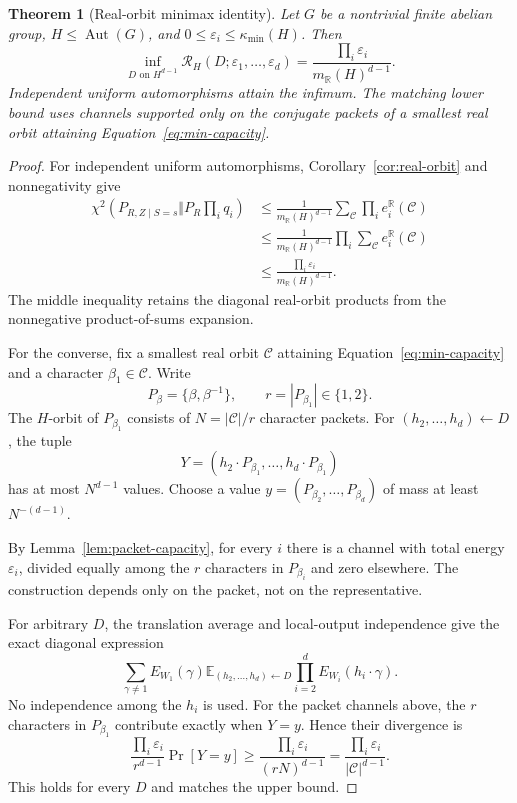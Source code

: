 \documentclass[11pt]{article}
\newtheorem{theorem}{Theorem}
\theoremstyle{definition}
\newcommand{\E}{\mathbb{E}}
\newcommand{\chitwo}{\chi^2}
\newcommand{\Aut}{\operatorname{Aut}}
\begin{document}
\begin{theorem}[Real-orbit minimax identity]\label{thm:minimax}
Let $G$ be a nontrivial finite abelian group, $H\leq\Aut(G)$, and
$0\leq\varepsilon_i\leq\kappa_{\min}(H)$.  Then
\begin{equation}\label{eq:minimax}
 \inf_{D\text{ on }H^{d-1}}
 \mathcal R_H(D;\varepsilon_1,\ldots,\varepsilon_d)
 =\frac{\prod_i\varepsilon_i}{m_{\mathbb R}(H)^{d-1}}.
\end{equation}
Independent uniform automorphisms attain the infimum.  The matching lower bound
uses channels supported only on the conjugate packets of a smallest real orbit
attaining Equation~\eqref{eq:min-capacity}.
\end{theorem}

\begin{proof}
For independent uniform automorphisms, Corollary~\ref{cor:real-orbit} and
nonnegativity give
\begin{align*}
 \chitwo(P_{R,Z\mid S=s}\Vert P_R\textstyle\prod_iq_i)
 &\leq\frac{1}{m_{\mathbb R}(H)^{d-1}}
      \sum_{\mathcal C}\prod_i e_i^{\mathbb R}(\mathcal C)\\
 &\leq\frac{1}{m_{\mathbb R}(H)^{d-1}}
      \prod_i\sum_{\mathcal C}e_i^{\mathbb R}(\mathcal C)\\
 &\leq\frac{\prod_i\varepsilon_i}{m_{\mathbb R}(H)^{d-1}}.
\end{align*}
The middle inequality retains the diagonal real-orbit products from the
nonnegative product-of-sums expansion.

For the converse, fix a smallest real orbit $\mathcal C$ attaining
Equation~\eqref{eq:min-capacity} and a character
$\beta_1\in\mathcal C$.  Write
\[
 P_\beta=\{\beta,\beta^{-1}\},\qquad r=|P_{\beta_1}|\in\{1,2\}.
\]
The $H$-orbit of $P_{\beta_1}$ consists of $N=|\mathcal C|/r$ character
packets.  For $(h_2,\ldots,h_d)\leftarrow D$, the tuple
\[
 Y=(h_2\cdot P_{\beta_1},\ldots,h_d\cdot P_{\beta_1})
\]
has at most $N^{d-1}$ values.  Choose a value
$y=(P_{\beta_2},\ldots,P_{\beta_d})$ of mass at least $N^{-(d-1)}$.

By Lemma~\ref{lem:packet-capacity}, for every $i$ there is a channel with total
energy $\varepsilon_i$, divided equally among the $r$ characters in
$P_{\beta_i}$ and zero elsewhere.  The construction depends only on the packet,
not on the representative.

For arbitrary $D$, the translation average and local-output independence give
the exact diagonal expression
\begin{equation}\label{eq:arbitrary-D}
 \sum_{\gamma\neq1} E_{W_1}(\gamma)
   \E_{(h_2,\ldots,h_d)\leftarrow D}
      \prod_{i=2}^{d}E_{W_i}(h_i\cdot\gamma).
\end{equation}
No independence among the $h_i$ is used.  For the packet channels above, the
$r$ characters in $P_{\beta_1}$ contribute exactly when $Y=y$.  Hence their
divergence is
\[
 \frac{\prod_i\varepsilon_i}{r^{d-1}}\Pr[Y=y]
 \geq\frac{\prod_i\varepsilon_i}{(rN)^{d-1}}
 =\frac{\prod_i\varepsilon_i}{|\mathcal C|^{d-1}}.
\]
This holds for every $D$ and matches the upper bound.
\end{proof}
\end{document}
